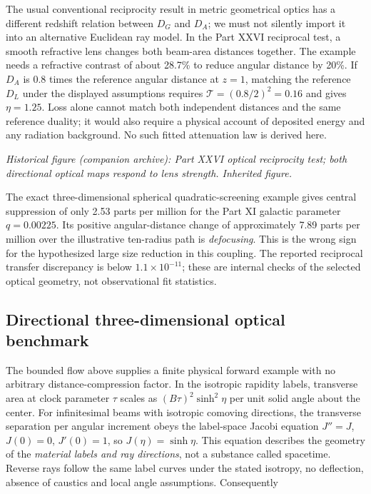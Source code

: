 \documentclass[
  11pt,
  twoside]{article}
\begin{document}
The usual conventional reciprocity result in metric geometrical optics
has a different redshift relation between \(D_G\) and \(D_A\); we must
not silently import it into an alternative Euclidean ray model. In the
Part XXVI reciprocal test, a smooth refractive lens changes both
beam-area distances together. The example needs a refractive contrast of
about 28.7\% to reduce angular distance by 20\%. If \(D_A\) is 0.8 times
the reference angular distance at \(z=1\), matching the reference
\(D_L\) under the displayed assumptions requires
\(\mathcal T=(0.8/2)^2=0.16\) and gives \(\eta=1.25\). Loss alone cannot
match both independent distances and the same reference duality; it
would also require a physical account of deposited energy and any
radiation background. No such fitted attenuation law is derived here.

\emph{Historical figure (companion archive): Part XXVI optical
reciprocity test; both directional optical maps respond to lens
strength. Inherited figure.}

The exact three-dimensional spherical quadratic-screening example gives
central suppression of only 2.53 parts per million for the Part XI
galactic parameter \(q=0.00225\). Its positive angular-distance change
of approximately 7.89 parts per million over the illustrative ten-radius
path is \emph{defocusing}. This is the wrong sign for the hypothesized
large size reduction in this coupling. The reported reciprocal transfer
discrepancy is below \(1.1\times10^{-11}\); these are internal checks of
the selected optical geometry, not observational fit statistics.

\subsection{Directional three-dimensional optical
benchmark}\label{directional-three-dimensional-optical-benchmark}

The bounded flow above supplies a finite physical forward example with
no arbitrary distance-compression factor. In the isotropic rapidity
labels, transverse area at clock parameter \(\tau\) scales as
\((B\tau)^2\sinh^2\eta\) per unit solid angle about the center. For
infinitesimal beams with isotropic comoving directions, the transverse
separation per angular increment obeys the label-space Jacobi equation
\(J''=J\), \(J(0)=0\), \(J'(0)=1\), so \(J(\eta)=\sinh\eta\). This
equation describes the geometry of the \emph{material labels and ray
directions}, not a substance called spacetime. Reverse rays follow the
same label curves under the stated isotropy, no deflection, absence of
caustics and local angle assumptions. Consequently
\end{document}

